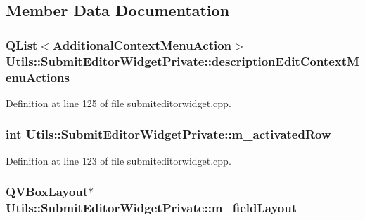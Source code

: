 \subsection{\-Member \-Data \-Documentation}
\hypertarget{struct_utils_1_1_submit_editor_widget_private_a789ad5be9463cbc80cdd09e3575050ca}{
\subsubsection[{description\-Edit\-Context\-Menu\-Actions}]{\setlength{\rightskip}{0pt plus 5cm}\-Q\-List$<${\bf \-Additional\-Context\-Menu\-Action}$>$ {\bf \-Utils\-::\-Submit\-Editor\-Widget\-Private\-::description\-Edit\-Context\-Menu\-Actions}}}\label{struct_utils_1_1_submit_editor_widget_private_a789ad5be9463cbc80cdd09e3575050ca}


\-Definition at line 125 of file submiteditorwidget.\-cpp.

\hypertarget{struct_utils_1_1_submit_editor_widget_private_a6827b630168b2e2696d7409ecfbb179f}{
\subsubsection[{m\-\_\-activated\-Row}]{\setlength{\rightskip}{0pt plus 5cm}int {\bf \-Utils\-::\-Submit\-Editor\-Widget\-Private\-::m\-\_\-activated\-Row}}}\label{struct_utils_1_1_submit_editor_widget_private_a6827b630168b2e2696d7409ecfbb179f}


\-Definition at line 123 of file submiteditorwidget.\-cpp.

\hypertarget{struct_utils_1_1_submit_editor_widget_private_aec37bbec70dab7d4c0cf949fac9d2433}{
\subsubsection[{m\-\_\-field\-Layout}]{\setlength{\rightskip}{0pt plus 5cm}\-Q\-V\-Box\-Layout$\ast$ {\bf \-Utils\-::\-Submit\-Editor\-Widget\-Private\-::m\-\_\-field\-Layout}}}\label{struct_utils_1_1_submit_editor_widget_private_aec37bbec70dab7d4c0cf949fac9d2433}


